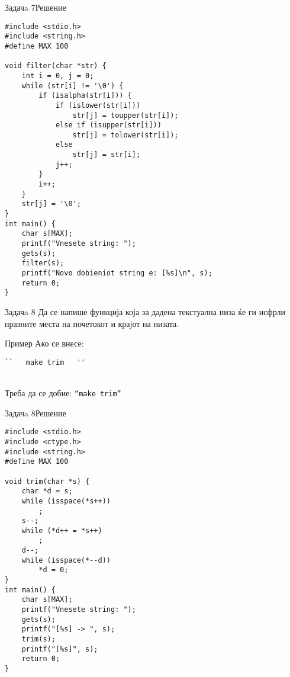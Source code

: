 \begin{frame}[fragile]{Задачa 7}{Решение}
\begin{lstlisting}
#include <stdio.h>
#include <string.h>
#define MAX 100

void filter(char *str) {
    int i = 0, j = 0;
    while (str[i] != '\0') {
        if (isalpha(str[i])) {
            if (islower(str[i]))
                str[j] = toupper(str[i]);
            else if (isupper(str[i]))
                str[j] = tolower(str[i]);
            else
                str[j] = str[i];
            j++;
        }
        i++;
    }
    str[j] = '\0';
}
int main() {
    char s[MAX];
    printf("Vnesete string: ");
    gets(s);
    filter(s);
    printf("Novo dobieniot string e: [%s]\n", s);
    return 0;
}
\end{lstlisting}
\end{frame}

\begin{frame}[fragile]{Задачa 8}
Да се напише функција која за дадена текстуална низа ќе ги исфрли празните места
на почетокот и крајот на низата.
\begin{exampleblock}{Пример}
Ако се внесе: \begin{verbatim}``   make trim   ''\end{verbatim} \\
Треба да се добие: \texttt{``make trim''} 
\end{exampleblock}
\end{frame}

\begin{frame}[fragile]{Задачa 8}{Решение}
\begin{lstlisting}
#include <stdio.h>
#include <ctype.h>
#include <string.h>
#define MAX 100

void trim(char *s) {
    char *d = s;
    while (isspace(*s++))
        ;
    s--;
    while (*d++ = *s++)
        ;
    d--;
    while (isspace(*--d))
        *d = 0;
}
int main() {
    char s[MAX];
    printf("Vnesete string: ");
    gets(s);
    printf("[%s] -> ", s);
    trim(s);
    printf("[%s]", s);
    return 0;
}
\end{lstlisting}
\end{frame}
